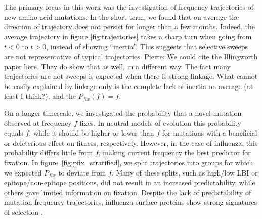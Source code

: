 \documentclass[reprint,amsmath,amssymb,superscriptaddress,showpacs,rmp]{revtex4-1}
\newcommand{\pierre}[1]{{\color{red}Pierre: #1}}
\providecommand{\DIFaddbegin}{} %
\providecommand{\DIFaddend}{} %
\newcommand{\DIFaddincludegraphics}[2][]{{\color{blue}\fbox{\DIFOincludegraphics[#1]{#2}}}} %
\DeclareRobustCommand{\DIFaddbegin}{\DIFOaddbegin \let\includegraphics\DIFaddincludegraphics} %
\DeclareRobustCommand{\DIFaddend}{\DIFOaddend \let\includegraphics\DIFOincludegraphics} %
\begin{document}
The primary focus in this work was the investigation of frequency trajectories of new amino acid mutations.  
In the short term, we found that on average the direction of trajectory does not persist for longer than a few months. 
Indeed, the average trajectory in figure \ref{fig:trajectories} takes a sharp turn when going from $t<0$ to $t>0$, instead of showing ``inertia''. 
This suggests that selective sweeps are not representative of typical trajectories. \DIFaddbegin \pierre{We could cite the Illingworth paper here. They do show that as well, in a different way. The fact many trajectories are not sweeps is expected when there is strong linkage. What cannot be easily explained by linkage only is the complete lack of inertia on average (at least I think?), and the $P_{fix}(f)=f$. }
\DIFaddend 

On a longer timescale, we investigated the probability that a novel mutation observed at frequency $f$ fixes.
In neutral models of evolution this probability equals $f$, while it should be higher or lower than $f$ for mutations with a beneficial or deleterious effect on fitness, respectively.
However, in the case of influenza, this probability differs little from $f$, making current frequency the best predictor for fixation. 
In figure~\ref{fig:pfix_stratified}, we split trajectories into groups for which we expected $P_{fix}$ to deviate from $f$. 
Many of these splits, such as high/low LBI or epitope/non-epitope positions, did not result in an increased predictability, while others gave limited information on fixation.
Despite the lack of predictability of mutation frequency trajectories, influenza surface proteins show strong signatures of selection \citep{bhatt_genomic_2011,strelkowa_clonal_2012}.

\end{document}
